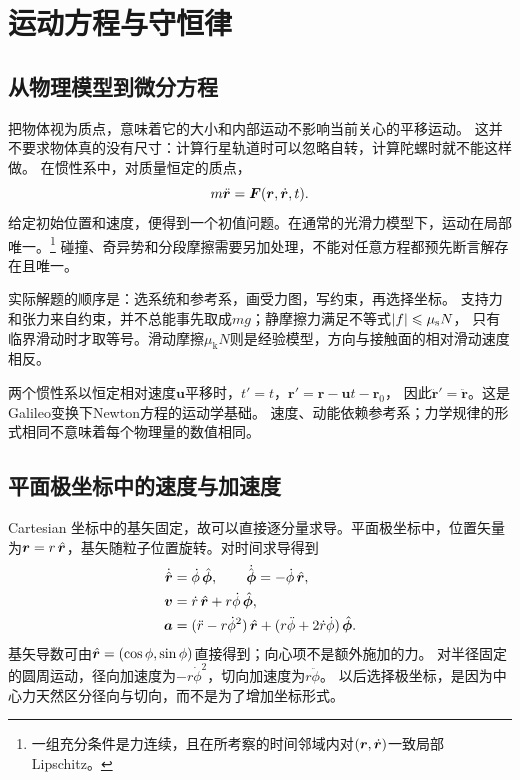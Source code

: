 \chapter{运动方程与守恒律}

\section{从物理模型到微分方程}
把物体视为质点，意味着它的大小和内部运动不影响当前关心的平移运动。
这并不要求物体真的没有尺寸：计算行星轨道时可以忽略自转，计算陀螺时就不能这样做。
在惯性系中，对质量恒定的质点，
\begin{equation}
 m\ddot{\bm r} = \bm F(\bm r,\dot{\bm{r}},t).
 \label{eq:cm-newton}
\end{equation}
给定初始位置和速度，便得到一个初值问题。在通常的光滑力模型下，运动在局部唯一。\footnote{一组充分条件是力连续，且在所考察的时间邻域内对$(\bm r,\dot{\bm{r}})$一致局部Lipschitz。}
碰撞、奇异势和分段摩擦需要另加处理，不能对任意方程都预先断言解存在且唯一。

实际解题的顺序是：选系统和参考系，画受力图，写约束，再选择坐标。
支持力和张力来自约束，并不总能事先取成$mg$；静摩擦力满足不等式$\lvert f\rvert \leqslant \mu_{\mathrm s} N$，
只有临界滑动时才取等号。滑动摩擦$\mu_{\mathrm k}N$则是经验模型，方向与接触面的相对滑动速度相反。

两个惯性系以恒定相对速度$\bm u$平移时，$t' = t$，$\bm r' = \bm r - \bm u t - \bm r_0$，
因此$\ddot{\bm r}' = \ddot{\bm r}$。这是Galileo变换下Newton方程的运动学基础。
速度、动能依赖参考系；力学规律的形式相同不意味着每个物理量的数值相同。

\section{平面极坐标中的速度与加速度}
Cartesian 坐标中的基矢固定，故可以直接逐分量求导。平面极坐标中，位置矢量为$\bm r = r\mathop{}\!\hat{\bm{r}}$，基矢随粒子位置旋转。对时间求导得到
\begin{subequations}
 \begin{align}
  \dot{\uvec r} &= \dot\phi\uvec\phi,\qquad \dot{\uvec\phi} = -\dot\phi\uvec r,\\
  \bm v &= \dot r\uvec r + r\dot\phi\uvec\phi,\\
  \bm a &= (\ddot r - r\dot\phi^2)\uvec r + (r\ddot\phi + 2\dot r\dot\phi)\uvec\phi. \label{eq:cm-polar-a}
 \end{align}
\end{subequations}
基矢导数可由$\mathop{}\!\hat{\bm{r}} = (\cos\phi,\sin\phi)$直接得到；向心项不是额外施加的力。
对半径固定的圆周运动，径向加速度为$-r\dot\phi^2$，切向加速度为$r\ddot\phi$。
以后选择极坐标，是因为中心力天然区分径向与切向，而不是为了增加坐标形式。

